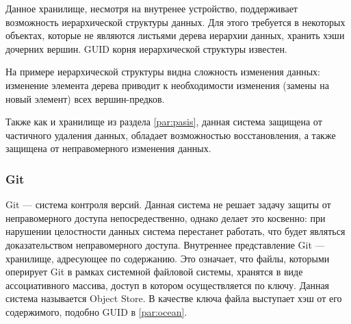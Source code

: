 Данное хранилище, несмотря на внутренее устройство, поддерживает возможность иерархической структуры данных. Для этого требуется в некоторых объектах, которые не являются листьями дерева иерархии данных, хранить хэши дочерних вершин. GUID корня иерархической структуры известен.

На примере иерархической структуры видна сложность изменения данных: изменение элемента дерева приводит к необходимости изменения (замены на новый элемент) всех вершин-предков.

Также как и хранилище из раздела \ref{par:pasis}, данная система защищена от частичного удаления данных, обладает возможностью восстановления, а также защищена от неправомерного изменения данных.

\subsubsection{Git}

Git\cite{git} --- система контроля версий. Данная система не решает задачу защиты от неправомерного доступа непосредественно, однако делает это косвенно: при нарушении целостности данных система перестанет работать, что будет являться доказательством неправомерного доступа. Внутреннее представление Git --- хранилище, адресующее по содержанию. Это означает, что файлы, которыми оперирует Git в рамках системной файловой системы, хранятся в виде ассоциативного массива, доступ в котором осуществляется по ключу. Данная система называется Object Store. В качестве ключа файла выступает хэш от его содержимого, подобно GUID в \ref{par:ocean}.

